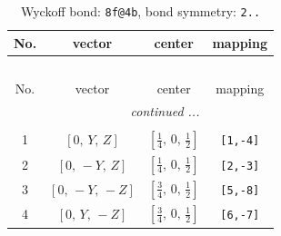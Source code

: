 \documentclass[fleqn,8pt]{jsarticle}
\begin{document}
\renewcommand{\arraystretch}{1.2}
\begin{longtable}{cccc}
\caption{Wyckoff bond: {\tt 8f@4b}, bond symmetry: {\tt 2..}}
 \\
 \hline \hline
No. & vector & center & mapping \\ \hline \endfirsthead

\multicolumn{3}{l}{\tablename\ \thetable{}} \\
 \hline \hline
No. & vector & center & mapping \\ \hline \endhead

 \hline \hline
\multicolumn{3}{r}{\footnotesize\it continued ...} \\ \endfoot

 \hline \hline
\multicolumn{3}{r}{} \\ \endlastfoot

1 & $\left[ 0,\, Y,\, Z \right]$ & $\left[ \frac{1}{4},\, 0,\, \frac{1}{2} \right]$ & {\tt [1,-4]} \\ \hline
2 & $\left[ 0,\, - Y,\, Z \right]$ & $\left[ \frac{1}{4},\, 0,\, \frac{1}{2} \right]$ & {\tt [2,-3]} \\ \hline
3 & $\left[ 0,\, - Y,\, - Z \right]$ & $\left[ \frac{3}{4},\, 0,\, \frac{1}{2} \right]$ & {\tt [5,-8]} \\ \hline
4 & $\left[ 0,\, Y,\, - Z \right]$ & $\left[ \frac{3}{4},\, 0,\, \frac{1}{2} \right]$ & {\tt [6,-7]} \\
\end{longtable}
\renewcommand{\arraystretch}{1.2}
\end{document}
